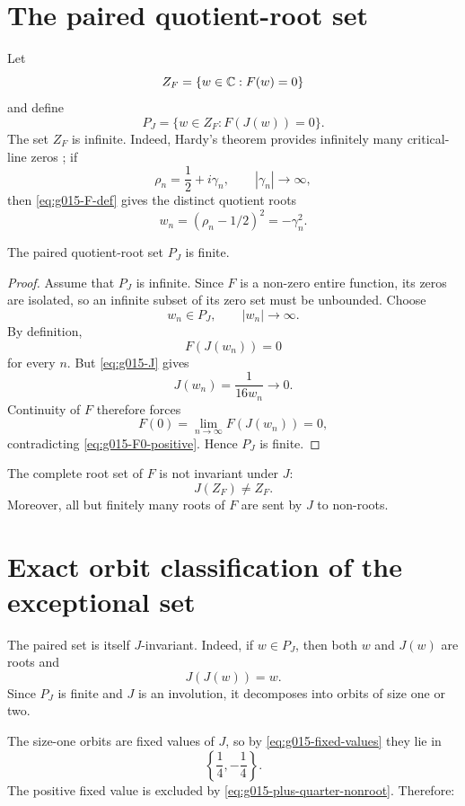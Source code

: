\section{The paired quotient-root set}

Let
\[
 Z_F=\{w\in\mathbb{C}:F(w)=0\}
\]
and define
\begin{equation}
 P_J
 =\{w\in Z_F:F(J(w))=0\}.
 \label{eq:g015-paired-set}
\end{equation}
The set $Z_F$ is infinite.  Indeed, Hardy's theorem provides infinitely many
critical-line zeros \citep{hardy1914}; if
\[
 \rho_n=\frac12+i\gamma_n,
 \qquad |\gamma_n|\to\infty,
\]
then \cref{eq:g015-F-def} gives the distinct quotient roots
\[
 w_n=(\rho_n-1/2)^2=-\gamma_n^2.
\]

\begin{theorem}
\label{thm:g015-paired-finite}
The paired quotient-root set $P_J$ is finite.
\end{theorem}

\begin{proof}
Assume that $P_J$ is infinite.  Since $F$ is a non-zero entire function, its
zeros are isolated, so an infinite subset of its zero set must be unbounded.
Choose
\[
 w_n\in P_J,
 \qquad |w_n|\to\infty.
\]
By definition,
\[
 F(J(w_n))=0
\]
for every $n$.  But \cref{eq:g015-J} gives
\[
 J(w_n)=\frac1{16w_n}\longrightarrow0.
\]
Continuity of $F$ therefore forces
\[
 F(0)
 =\lim_{n\to\infty}F(J(w_n))
 =0,
\]
contradicting \cref{eq:g015-F0-positive}.  Hence $P_J$ is finite.
\end{proof}

\begin{corollary}
\label{cor:g015-no-global-invariance}
The complete root set of $F$ is not invariant under $J$:
\[
 \boxed{J(Z_F)\ne Z_F.}
\]
Moreover, all but finitely many roots of $F$ are sent by $J$ to non-roots.
\end{corollary}

\section{Exact orbit classification of the exceptional set}

The paired set is itself $J$-invariant.  Indeed, if $w\in P_J$, then both
$w$ and $J(w)$ are roots and
\[
 J(J(w))=w.
\]
Since $P_J$ is finite and $J$ is an involution, it decomposes into orbits of
size one or two.

The size-one orbits are fixed values of $J$, so by
\cref{eq:g015-fixed-values} they lie in
\[
 \left\{\frac14,-\frac14\right\}.
\]
The positive fixed value is excluded by
\cref{eq:g015-plus-quarter-nonroot}.  Therefore:

